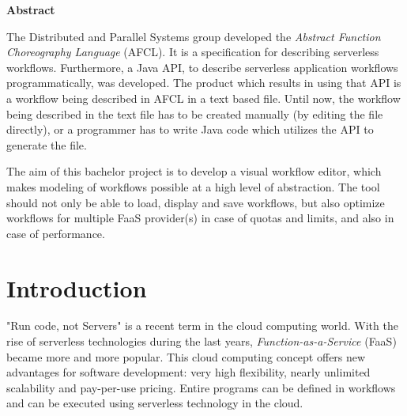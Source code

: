 \documentclass[a4paper,top=25mm,bottom=25mm,12pt,pdftex,halfparskip,twoside,bibtotoc,numbers=noenddot]{scrbook}
\begin{document}


\clearpage



\clearpage

\thispagestyle{plain}

\vspace{2.5cm}
\begin{center}
\textbf{Abstract}
\end{center}


The Distributed and Parallel Systems group developed the \emph{Abstract Function Choreography Language} (AFCL). It is a specification for describing serverless workflows. Furthermore, a Java API, to describe serverless application workflows programmatically, was developed.
The product which results in using that API is a workflow being described in AFCL in a text based file.
Until now, the workflow being described in the text file has to be created manually (by editing the file directly), or a programmer has to write Java code which utilizes the API to generate the file.
\par
The aim of this bachelor project is to develop a visual workflow editor, which makes modeling of workflows possible at a high level of abstraction. The tool should not only be able to load, display and save workflows, but also optimize workflows for multiple FaaS provider(s) in case of quotas and limits, and also in case of performance.

\tableofcontents

\listoffigures

\listoftables

\mainmatter
\pagestyle{fancy}

\renewcommand{\chaptermark}[1]{%
	\markboth{\thechapter.\ #1}{}
}

\fancyhead{}
\fancyhead[LO]{\leftmark}
\fancyhead[RE]{\rightmark}
\fancyfoot{}
\fancyfoot[LO,RE]{\thepage}

\label{chap:introduction}
\chapter{Introduction}



"Run code, not Servers" is a recent term in the cloud computing world.
With the rise of serverless technologies during the last years, \emph{Function-as-a-Service} (FaaS) became more and more popular. This cloud computing concept offers new advantages for software development: very high flexibility, nearly unlimited scalability and pay-per-use pricing. Entire programs can be defined in workflows and can be executed using serverless technology in the cloud.
\end{document}

